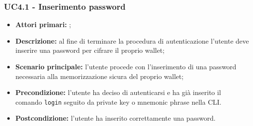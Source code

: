 \subsubsection{UC4.1 - Inserimento password}
\begin{itemize}
	\item \textbf{Attori primari:} \una{};
	\item \textbf{Descrizione:} al fine di terminare la procedura di autenticazione l’utente deve inserire una password per cifrare il proprio wallet;
	\item \textbf{Scenario principale:} l’utente procede con l’inserimento di 
	una password necessaria alla memorizzazione sicura del proprio wallet;  
	\item \textbf{Precondizione:} l’utente ha deciso di autenticarsi e ha già inserito
	il comando \texttt{login} seguito da private key o mnemonic phrase nella CLI.
	\item \textbf{Postcondizione:} l’utente ha inserito correttamente una password. 
\end{itemize}